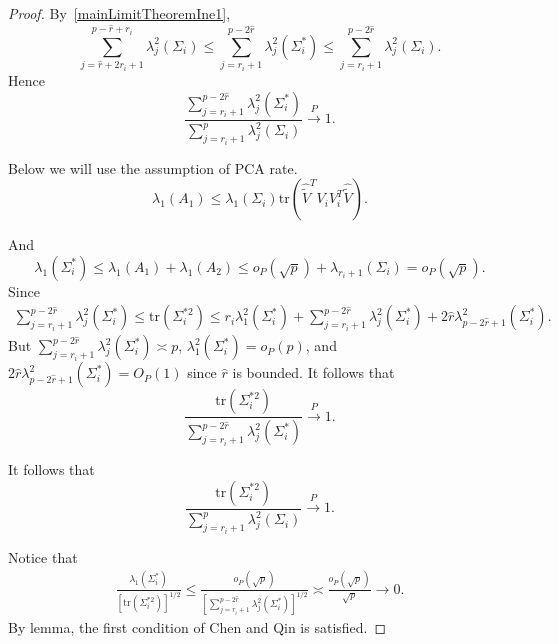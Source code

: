 \begin{proof}
    By~\eqref{mainLimitTheoremIne1}, 
    \begin{equation}
        \sum_{j=\hat{r}+2r_i+1}^{p-\hat{r}+r_i}\lambda_j^2(\Sigma_i)\leq
\sum_{j=r_i+1}^{p-2\hat{r}}\lambda_j^2(\Sigma_i^*)\leq
\sum_{j=r_i+1}^{p-2\hat{r}}\lambda_j^2(\Sigma_i).
    \end{equation}
    Hence 
    \begin{equation}\label{mainLimitTheoremIne2}
        \frac{\sum_{j=r_i+1}^{p-2\hat{r}}\lambda_j^2(\Sigma_i^*)}{\sum_{j=r_i+1}^{p}\lambda_j^2(\Sigma_i)}\xrightarrow{P}1.
    \end{equation}

Below we will use the assumption of PCA rate.
    \begin{equation}
        \lambda_1(A_1)\leq \lambda_1(\Sigma_i)\mathrm{tr} (\hat{\tilde{V}}^T V_i V_i^T \hat{\tilde{V}}).
    \end{equation}

     And 
    \begin{equation}
        \lambda_1(\Sigma_i^*)\leq \lambda_1(A_1)+\lambda_1(A_2)\leq o_P(\sqrt{p})+\lambda_{r_i+1}(\Sigma_i)=o_P(\sqrt{p}).
    \end{equation}
    Since
    \begin{equation*}
        \begin{aligned}
            \sum_{j=r_i+1}^{p-2\hat{r}}\lambda_j^2(\Sigma_i^*)\leq \mathrm{tr}(\Sigma_i^{*2})
            \leq r_i \lambda_1^2(\Sigma_i^*)+
            \sum_{j=r_i+1}^{p-2\hat{r}}\lambda_j^2(\Sigma_i^*)+
            2\hat{r}\lambda_{p-2\hat{r}+1}^2(\Sigma_i^*).
        \end{aligned}
    \end{equation*}
    But $\sum_{j=r_i+1}^{p-2\hat{r}}\lambda_j^2(\Sigma_i^*)\asymp p$, $\lambda_1^2(\Sigma_i^*)=o_P(p)$, and $2\hat{r}\lambda_{p-2\hat{r}+1}^2(\Sigma_i^*)=O_P(1)$ since $\hat{r}$ is bounded.
    It follows that
    \begin{equation}
        \frac{\mathrm{tr}(\Sigma_i^{*2})}{\sum_{j=r_i+1}^{p-2\hat{r}}\lambda_j^2(\Sigma_i^*)}\xrightarrow{P}1.
    \end{equation}

    It follows that
    \begin{equation}
        \frac{\mathrm{tr}(\Sigma_i^{*2})}{\sum_{j=r_i+1}^{p}\lambda_j^2(\Sigma_i)}\xrightarrow{P}1.
    \end{equation}

    Notice that
    \begin{equation}
        \begin{aligned}
            \frac{\lambda_1(\Sigma_i^*)}{{[\mathrm{tr}(\Sigma_i^{*2})]}^{1/2}}\leq 
            \frac{o_P(\sqrt{p})}{{[\sum_{j=r_i+1}^{p-2\hat{r}}\lambda_j^2(\Sigma_i^*)]}^{1/2}}
            \asymp
            \frac{o_P(\sqrt{p})}{\sqrt{p}}\to 0.
        \end{aligned}
    \end{equation}
By lemma, the first condition of Chen and Qin is satisfied.



\end{proof}

